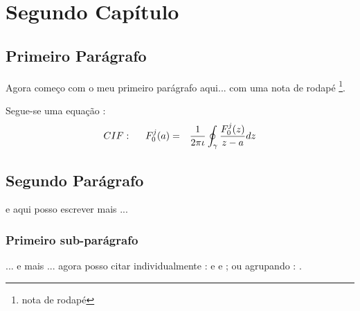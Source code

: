 
\chapter{Segundo Capítulo}
\graphicspath{{Chapters/Chapter1/Chapter1Figs/PNG/}{Chapters/Chapter1/Chapter1Figs/PDF/}{Chapters/Chapter1/Chapter1Figs/}}

\section{Primeiro Parágrafo}
Agora começo com o meu primeiro parágrafo aqui... com uma nota de rodapé \footnote{nota de rodapé}.


Segue-se uma equação :
\begin{eqnarray}
CIF: \hspace*{5mm}F_0^j(a) &=& \frac{1}{2\pi \iota} \oint_{\gamma} \frac{F_0^j(z)}{z - a} dz
\end{eqnarray}


\section{Segundo Parágrafo}
e aqui posso escrever mais ... \cite{texbook}

\subsection{Primeiro sub-parágrafo}
... e mais ...
agora posso citar individualmente : \cite{latex} e \cite{texbook}
e \cite{Rud73}; ou agrupando : \cite{latex, texbook, Rud73}.

